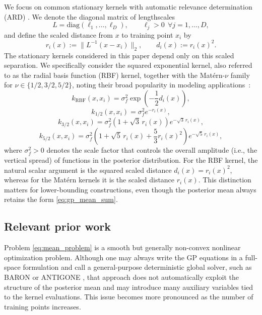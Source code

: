 \documentclass[pdflatex,sn-mathphys-num]{sn-jnl}%
\theoremstyle{thmstyleone}%
\theoremstyle{thmstyletwo}%
\theoremstyle{thmstylethree}%
\begin{document}
We focus on common stationary kernels with automatic relevance determination (ARD) \cite{ref:gp_book}. We denote the diagonal matrix of lengthscales
\[
L=\mathrm{diag}(\ell_1,\ldots,\ell_D),
\qquad
\ell_j>0 \ \ \forall j=1,\ldots,D,
\]
and define the scaled distance from $x$ to training point $x_i$ by
\begin{equation}
r_i(x):=\|L^{-1}(x-x_i)\|_2,
\qquad
d_i(x):=r_i(x)^2.
\label{eq:scaled_distance}
\end{equation}
The stationary kernels considered in this paper depend only on this scaled separation. We specifically consider the squared exponential kernel, also referred to as the radial basis function (RBF) kernel, together with the Mat\'ern-$\nu$ family for $\nu\in\{1/2,3/2,5/2\}$, noting their broad popularity in modeling applications~\cite{ref:gp_book}:
\[
k_{\mathrm{RBF}}(x,x_i)=\sigma_f^2\exp\!\left(-\frac{1}{2}d_i(x)\right),
\]
\[
k_{1/2}(x,x_i)=\sigma_f^2 e^{-r_i(x)},
\]
\[
k_{3/2}(x,x_i)=\sigma_f^2\left(1+\sqrt{3}\,r_i(x)\right)e^{-\sqrt{3}\,r_i(x)},
\]
\[
k_{5/2}(x,x_i)=\sigma_f^2\left(1+\sqrt{5}\,r_i(x)+\frac{5}{3}r_i(x)^2\right)e^{-\sqrt{5}\,r_i(x)},
\]
where $\sigma_f^2 > 0$ denotes the scale factor that controls the overall amplitude (i.e., the vertical spread) of functions in the posterior distribution. For the RBF kernel, the natural scalar argument is the squared scaled distance $d_i(x) = r_i(x)^2$, whereas for the Mat\'ern kernels it is the scaled distance $r_i(x)$. This distinction matters for lower-bounding constructions, even though the posterior mean always retains the form \eqref{eq:gp_mean_sum}.

\subsection{Relevant prior work}

Problem \eqref{eq:mean_problem} is a smooth but generally non-convex nonlinear optimization problem. Although one may always write the GP equations in a full-space formulation and call a general-purpose deterministic global solver, such as BARON \cite{ref:baron} or ANTIGONE \cite{ref:antigone}, that approach does not automatically exploit the structure of the posterior mean and may introduce many auxiliary variables tied to the kernel evaluations. This issue becomes more pronounced as the number of training points increases.
\end{document}
